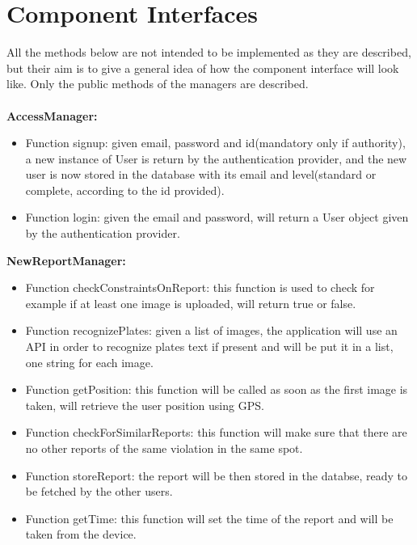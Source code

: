 \documentclass[../RASD.tex]{subfiles}
\begin{document}
    \section{Component Interfaces}\label{sec:component-interfaces}
    \begin{figure}[H]
    \end{figure}
    All the methods below are not intended to be implemented as they are described, but their aim is to give a general idea of how the component interface will look like. Only the public methods of the managers are described.
    \\
    \\
    \textbf{AccessManager:}
    \begin{itemize}
        \item Function signup: given email, password and id(mandatory only if authority), a new instance of User is return by the authentication provider, and the new user is now stored in the database with its email and level(standard or complete, according to the id provided).
        \item Function login: given the email and password, will return a User object given by the authentication provider.
    \end{itemize}
    \textbf{NewReportManager:}
    \begin{itemize}
        \item     Function checkConstraintsOnReport: this function is used to check for example if at least one image is uploaded, will return true or false.
        \item     Function recognizePlates: given a list of images, the application will use an API in order to recognize plates text if present and will be put it in a list, one string for each image.
        \item     Function getPosition: this function will be called as soon as the first image is taken, will retrieve the user position using GPS.
        \item     Function checkForSimilarReports: this function will make sure that there are no other reports of the same violation in the same spot.
        \item     Function storeReport: the report will be then stored in the databse, ready to be fetched by the other users.
        \item     Function getTime: this function will set the time of the report and will be taken from the device.
    \end{itemize}
\end{document}
